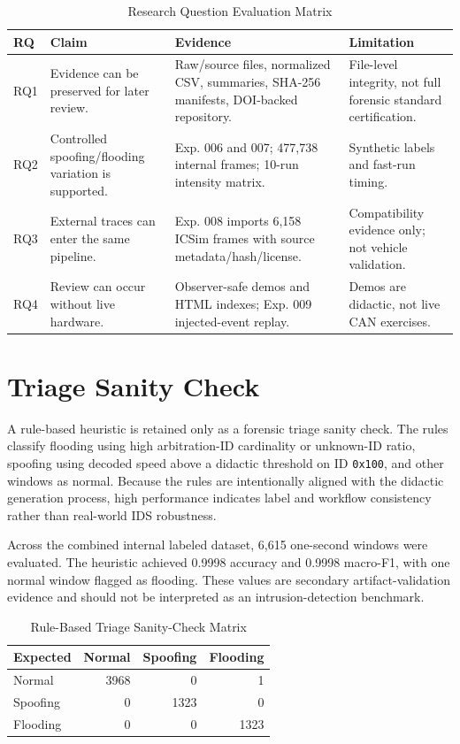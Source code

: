\documentclass[conference]{IEEEtran}
\begin{document}
\begin{table}[t]
\caption{Research Question Evaluation Matrix}
\label{tab:rq}
\centering
\footnotesize
\begin{tabular}{p{}p{}p{}p{}}
\toprule
RQ & Claim & Evidence & Limitation \\
\midrule
RQ1 & Evidence can be preserved for later review. & Raw/source files, normalized CSV, summaries, SHA-256 manifests, DOI-backed repository. & File-level integrity, not full forensic standard certification. \\
RQ2 & Controlled spoofing/flooding variation is supported. & Exp. 006 and 007; 477,738 internal frames; 10-run intensity matrix. & Synthetic labels and fast-run timing. \\
RQ3 & External traces can enter the same pipeline. & Exp. 008 imports 6,158 ICSim frames with source metadata/hash/license. & Compatibility evidence only; not vehicle validation. \\
RQ4 & Review can occur without live hardware. & Observer-safe demos and HTML indexes; Exp. 009 injected-event replay. & Demos are didactic, not live CAN exercises. \\
\bottomrule
\end{tabular}
\end{table}

\section{Triage Sanity Check}
A rule-based heuristic is retained only as a forensic triage sanity check. The rules classify flooding using high arbitration-ID cardinality or unknown-ID ratio, spoofing using decoded speed above a didactic threshold on ID \texttt{0x100}, and other windows as normal. Because the rules are intentionally aligned with the didactic generation process, high performance indicates label and workflow consistency rather than real-world IDS robustness.

Across the combined internal labeled dataset, 6,615 one-second windows were evaluated. The heuristic achieved 0.9998 accuracy and 0.9998 macro-F1, with one normal window flagged as flooding. These values are secondary artifact-validation evidence and should not be interpreted as an intrusion-detection benchmark.

\begin{table}[t]
\caption{Rule-Based Triage Sanity-Check Matrix}
\label{tab:triage}
\centering
\footnotesize
\begin{tabular}{lrrr}
\toprule
Expected & Normal & Spoofing & Flooding \\
\midrule
Normal & 3968 & 0 & 1 \\
Spoofing & 0 & 1323 & 0 \\
Flooding & 0 & 0 & 1323 \\
\bottomrule
\end{tabular}
\end{table}
\end{document}
